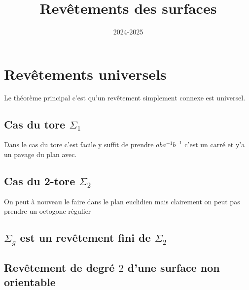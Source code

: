 \documentclass[a4paper,12pt]{article}
\title{Revêtements des surfaces}
\date{2024-2025}
\theoremstyle{plain}
\theoremstyle{definition}
\theoremstyle{remark}
\begin{document}
\maketitle
\tableofcontents

\section{Revêtements universels}
Le théorème principal c'est qu'un revêtement simplement
connexe est universel.
\subsection{Cas du tore $\Sigma_1$ }
Dans le cas du tore c'est facile y suffit de
prendre $aba^{-1}b^{-1}$ c'est un carré et
y'a un pavage du plan avec.

\subsection{Cas du 2-tore $\Sigma_2$ }
On peut à nouveau le faire dans le plan euclidien
mais clairement on peut pas prendre un octogone
régulier

\subsection{$\Sigma_g$ est un revêtement fini de $\Sigma_2$ }



\subsection{Revêtement de degré $2$ 
d'une surface non orientable} 









\end{document}
